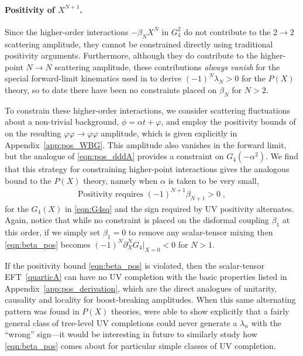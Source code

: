 \documentclass[11pt]{article}
\begin{document}
\paragraph{Positivity of $X^{N+1}$.}
Since the higher-order interactions $-\beta_{N} X^{N}$ in $G_4^2$ do not contribute to the $2 \to 2$ scattering amplitude, they cannot be constrained directly using traditional positivity arguments. 
Furthermore, although they do contribute to the higher-point $N \to N$ scattering amplitude, these contributions \emph{always vanish} for the special forward-limit kinematics used in \cite{Chandrasekaran:2018qmx} to derive  $(-1)^N \lambda_N > 0$ for the $P(X)$ theory, so to date there have been no constraints placed on $\beta_N$ for $N>2$.

To constrain these higher-order interactions, we consider scattering fluctuations about a non-trivial background, $\phi = \alpha  t + \varphi$, and employ the positivity bounds of \cite{Grall:2021xxm} on the resulting $\varphi \varphi \to \varphi \varphi$ amplitude, which is given explicitly in Appendix~\ref{app:pos_WBG}. This amplitude also vanishes in the forward limit, but the analogue of \eqref{eqn:pos_dddA} provides a constraint on $G_4 ( - \alpha^2)$.
We find that this strategy for constraining higher-point interactions gives the analogous bound to the $P(X)$ theory, namely when $\alpha$ is taken to be very small,
\begin{align}
 \text{Positivity requires } (-1)^{N+1} \beta_{N+1} > 0 \; ,
\label{eqn:beta_pos}
\end{align}
for the $G_4(X)$ in \eqref{eqn:G4sq} and the sign required by UV positivity alternates. 
Again, notice that while no constraint is placed on the disformal coupling $\beta_1$ at this order, if we simply  set  $\beta_1 = 0$ to remove any scalar-tensor mixing then \eqref{eqn:beta_pos} becomes $(-1)^N \partial_X^N G_{4} |_{X=0} < 0$ for $N>1$. 

If the positivity bound \eqref{eqn:beta_pos} is violated, then the scalar-tensor EFT~\eqref{quarticA} can have no UV completion with the basic properties listed in Appendix~\ref{app:pos_derivation}, which are the direct analogues of unitarity, causality and locality for boost-breaking amplitudes. 
When this same alternating pattern was found in $P(X)$ theories, \cite{Chandrasekaran:2018qmx} were able to show explicitly that a fairly general class of tree-level UV completions could never generate a $\lambda_n$ with the ``wrong'' sign---it would be interesting in future to similarly study how \eqref{eqn:beta_pos} comes about for particular simple classes of UV completion.  
\end{document}

